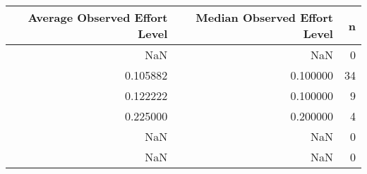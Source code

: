 \begin{tabular}{rrr}
\toprule
Average Observed Effort Level & Median Observed Effort Level & n \\
\midrule
NaN & NaN & 0 \\
0.105882 & 0.100000 & 34 \\
0.122222 & 0.100000 & 9 \\
0.225000 & 0.200000 & 4 \\
NaN & NaN & 0 \\
NaN & NaN & 0 \\
\bottomrule
\end{tabular}
